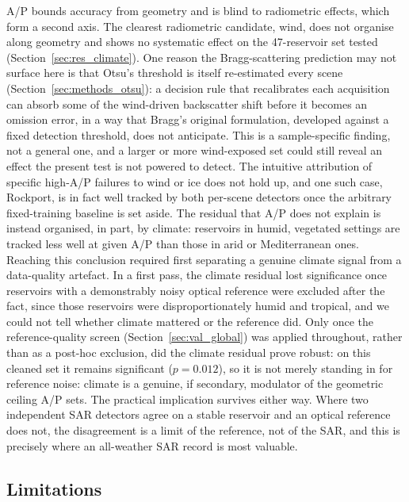 A/P bounds accuracy from geometry and is blind to radiometric effects, which
form a second axis. The clearest radiometric candidate, wind, does not organise
along geometry and shows no systematic effect on the 47-reservoir set tested
(Section~\ref{sec:res_climate}). One reason the Bragg-scattering prediction
\citep{Valenzuela1978} may not surface here is that Otsu's threshold is
itself re-estimated every scene (Section~\ref{sec:methods_otsu}): a decision
rule that recalibrates each acquisition can absorb some of the wind-driven
backscatter shift before it becomes an omission error, in a way that Bragg's
original formulation, developed against a fixed detection threshold, does not
anticipate. This is a sample-specific finding, not a general one, and a
larger or more wind-exposed set could still reveal an effect the present test
is not powered to detect. The intuitive attribution of specific
high-A/P failures to wind or ice does not hold up, and one such case, Rockport,
is in fact well tracked by both per-scene detectors once the arbitrary
fixed-training baseline is set aside. The residual that A/P does not explain is
instead organised, in part, by climate: reservoirs in humid, vegetated settings
are tracked less well at given A/P than those in arid or Mediterranean ones.
Reaching this conclusion required first separating a genuine climate signal
from a data-quality artefact. In a first pass, the climate residual lost
significance once reservoirs with a demonstrably noisy optical reference were
excluded after the fact, since those reservoirs were disproportionately
humid and tropical, and we could not tell whether climate mattered or the
reference did. Only once the reference-quality screen (Section~\ref{sec:val_global})
was applied throughout, rather than as a post-hoc exclusion, did the
climate residual prove robust: on this cleaned set it remains
significant ($p=0.012$), so it is not merely standing in for reference noise:
climate is a genuine, if secondary, modulator of the geometric ceiling A/P
sets. The practical implication survives either way. Where two independent
SAR detectors agree on a stable reservoir and an optical reference does not,
the disagreement is a limit of the reference, not of the SAR, and this is
precisely where an all-weather SAR record is most valuable.

\subsection{Limitations}
\label{sec:disc_limitations}

